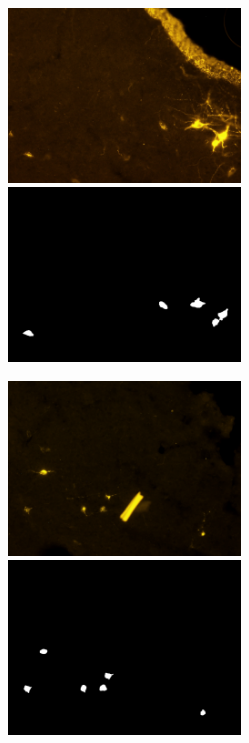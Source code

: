 \begin{figure}[ht]\ContinuedFloat
\centerline{
\includegraphics[width=0.55\textwidth]{figures/120_dataset/i_252.jpeg}
\includegraphics[width=0.55\textwidth]{figures/120_dataset/m_252.jpeg}
}
\centerline{
\includegraphics[width=0.55\textwidth]{figures/120_dataset/i_maccherone.jpeg}
\includegraphics[width=0.55\textwidth]{figures/120_dataset/m_maccherone.png}
}
\caption{
}
\end{figure}
